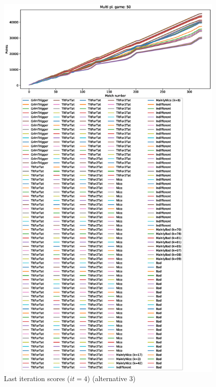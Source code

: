 \documentclass[journal,10pt,twoside]{IEEEtran}
\begin{document}
\begin{figure}[!ht]
    \centering
    \includegraphics[width=1\columnwidth]{../img/ripdmp-incr/alt3/ripdmp-scores-increasing-pop-50-r4}
    \caption{Last iteration scores ($it=4$) (alternative 3)}
    \label{fig:incrLIa3}
\end{figure}
\end{document}
